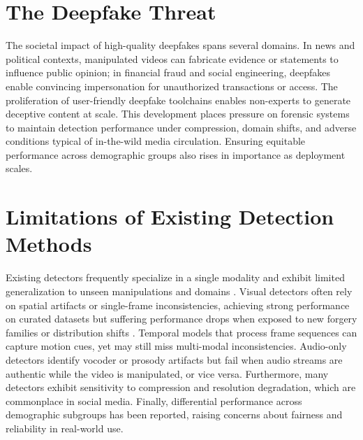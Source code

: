 \section{The Deepfake Threat}
The societal impact of high-quality deepfakes spans several domains. In news and political contexts, manipulated videos can fabricate evidence or statements to influence public opinion; in financial fraud and social engineering, deepfakes enable convincing impersonation for unauthorized transactions or access. The proliferation of user-friendly deepfake toolchains enables non-experts to generate deceptive content at scale. This development places pressure on forensic systems to maintain detection performance under compression, domain shifts, and adverse conditions typical of in-the-wild media circulation. Ensuring equitable performance across demographic groups also rises in importance as deployment scales.

\section{Limitations of Existing Detection Methods}
Existing detectors frequently specialize in a single modality and exhibit limited generalization to unseen manipulations and domains \cite{mubarak2023survey}. Visual detectors often rely on spatial artifacts or single-frame inconsistencies, achieving strong performance on curated datasets but suffering performance drops when exposed to new forgery families or distribution shifts \cite{rossler2019faceforensics}. Temporal models that process frame sequences can capture motion cues, yet may still miss multi-modal inconsistencies. Audio-only detectors identify vocoder or prosody artifacts but fail when audio streams are authentic while the video is manipulated, or vice versa. Furthermore, many detectors exhibit sensitivity to compression and resolution degradation, which are commonplace in social media. Finally, differential performance across demographic subgroups has been reported, raising concerns about fairness and reliability in real-world use.


